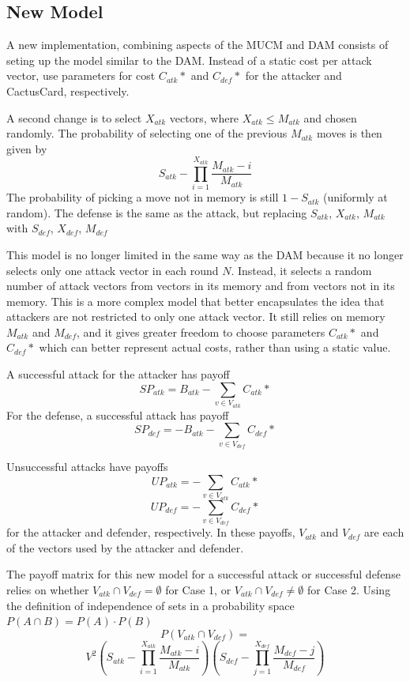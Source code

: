 \documentclass[11pt,journal]{IEEEtran}
\begin{document}
\subsection{New Model}
A new implementation, combining aspects of the MUCM and DAM consists of seting up the model similar to the DAM. Instead of a static cost per attack vector, use parameters for cost $C_{atk}{*}$ and $C_{def}{*}$ for the attacker and CactusCard, respectively.
\par
A second change is to select $X_{atk}$ vectors, where $X_{atk} \leq M_{atk}$ and chosen randomly. The probability of selecting one of the previous $M_{atk}$ moves is then given by
\[S_{atk} - \prod_{i=1}^{X_{atk}} \frac{M_{atk}-i}{M_{atk}}\]
The probability of picking a move not in memory is still $1-S_{atk}$ (uniformly at random). The defense is the same as the attack, but replacing $S_{atk}$, $X_{atk}$, $M_{atk}$ with $S_{def}$, $X_{def}$, $M_{def}$
\par
This model is no longer limited in the same way as the DAM because it no longer selects only one attack vector in each round $N$. Instead, it selects a random number of attack vectors from vectors in its memory and from vectors not in its memory. This is a more complex model that better encapsulates the idea that attackers are not restricted to only one attack vector. It still relies on memory $M_{atk}$ and $M_{def}$, and it gives greater freedom to choose parameters $C_{atk}*$ and $C_{def}*$ which can better represent actual costs, rather than using a static value.
\par
A successful attack for the attacker has payoff \[SP_{atk} = B_{atk} -\sum_{v \in V_{atk}} C_{atk}*\]
For the defense, a successful attack has payoff \[SP_{def} = -B_{atk} -\sum_{v \in V_{def}} C_{def}*\]
\par
Unsuccessful attacks have payoffs \[UP_{atk} = -\sum_{v \in V_{atk}} C_{atk}*\] \[UP_{def} = -\sum_{v \in V_{def}} C_{def}*\] for the attacker and defender, respectively. In these payoffs, $V_{atk}$ and $V_{def}$ are each of the vectors used by the attacker and defender.
\par
The payoff matrix for this new model for a successful attack or successful defense relies on whether $V_{atk} \cap V_{def} = \emptyset$ for Case 1, or $V_{atk} \cap V_{def} \neq \emptyset$ for Case 2. Using the definition of independence of sets in a probability space $P(A \cap B) = P(A)\cdot P(B)$
\[P( V_{atk} \cap V_{def}) =\]
\[ V^2 ( S_{atk} - \prod_{i=1}^{X_{atk}} \frac{M_{atk}-i}{M_{atk}}) ( S_{def} - \prod_{j=1}^{X_{def}} \frac{M_{def}-j}{M_{def}}) \]
\end{document}
